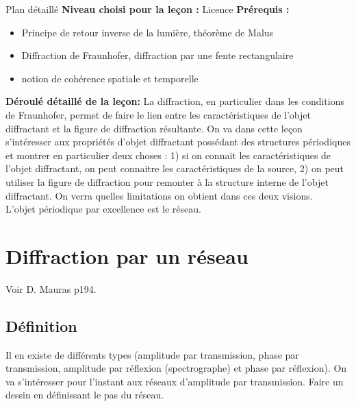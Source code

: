 \begin{reportBlock}{Plan détaillé}
  \textbf{Niveau choisi pour la leçon :} Licence
  \newline
  \textbf{Prérequis : }
  \begin{itemize}
      \item Principe de retour inverse de la lumière, théorème de Malus
      \item Diffraction de Fraunhofer, diffraction par une fente rectangulaire
      \item notion de cohérence spatiale et temporelle
  \end{itemize} 

  
  \textbf{Déroulé détaillé de la leçon: }   \newline
La diffraction, en particulier dans les conditions de  Fraunhofer, permet de faire le lien entre les caractéristiques de l’objet diffractant et la figure de diffraction résultante. On va dans cette leçon s'intéresser aux propriétés d'objet diffractant possédant des structures périodiques et montrer en particulier deux choses : 1) si on connait les caractéristiques de l'objet diffractant, on peut connaitre les caractéristiques de la source, 2) on peut utiliser la figure de diffraction pour remonter à la structure interne de l'objet diffractant. On verra quelles limitations on obtient dans ces deux visions.\\

L'objet périodique par excellence est le réseau.

  \section{Diffraction par un réseau}
  Voir D. Mauras p194.
  \subsection{Définition}
  Il en existe de différents types (amplitude par transmission, phase par transmission, amplitude par réflexion (spectrographe) et phase par réflexion). On va s'intéresser pour l'instant aux réseaux d'amplitude par transmission. Faire un dessin en définissant le pas du réseau.


\end{reportBlock}
